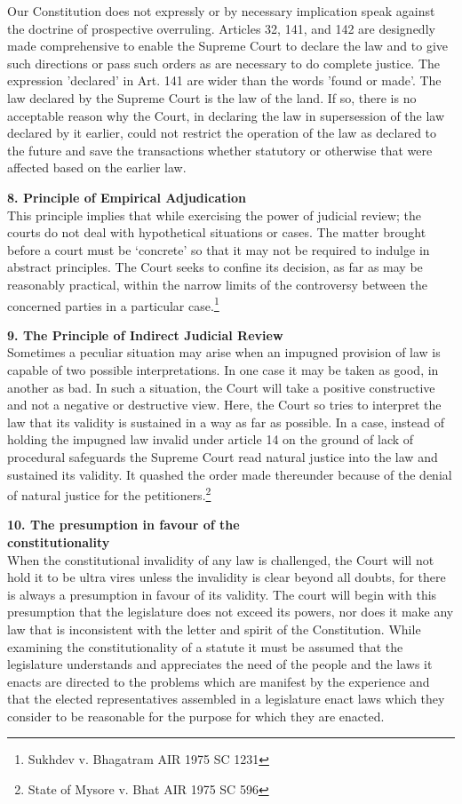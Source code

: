 \begin{multicols}{2}
\noi
Our Constitution does not expressly or by necessary implication speak against the
doctrine of prospective overruling. Articles 32, 141, and 142 are designedly made
comprehensive to enable the Supreme Court to declare the law and to give such
directions or pass such orders as are necessary to do complete justice. The expression
'declared' in Art. 141 are wider than the words 'found or made'. The law declared by the
Supreme Court is the law of the land. If so, there is no acceptable reason why the Court,
in declaring the law in supersession of the law declared by it earlier, could not restrict
the operation of the law as declared to the future and save the transactions whether
statutory or otherwise that were affected based on the earlier law.

\noi
{\bf 8. Principle of Empirical Adjudication}\\[0.2cm]
This principle implies that while exercising the power of judicial review; the courts do
not deal with hypothetical situations or cases. The matter brought before a court must
be ‘concrete’ so that it may not be required to indulge in abstract principles. The Court
seeks to confine its decision, as far as may be reasonably practical, within the narrow
limits of the controversy between the concerned parties in a particular case.\footnote{Sukhdev v. Bhagatram AIR 1975 SC 1231}

\noi
{\bf 9. The Principle of Indirect Judicial Review}\\[0.2cm] Sometimes a peculiar situation may arise when an impugned provision of law is capable
of two possible interpretations. In one case it may be taken as good, in another as bad.
In such a situation, the Court will take a positive constructive and not a negative or
destructive view. Here, the Court so tries to interpret the law that its validity is sustained
in a way as far as possible. In a case, instead of holding the impugned law invalid under
article 14 on the ground of lack of procedural safeguards the Supreme Court read
natural justice into the law and sustained its validity. It quashed the order made
thereunder because of the denial of natural justice for the petitioners.\footnote{ State of Mysore v. Bhat AIR 1975 SC 596}

\noi
{\bf 10. The presumption in favour of the\\ constitutionality}\\[0.2cm] When the constitutional invalidity of any law is challenged, the Court will not hold it
to be ultra vires unless the invalidity is clear beyond all doubts, for there is always a
presumption in favour of its validity. The court will begin with this presumption that
the legislature does not exceed its powers, nor does it make any law that is inconsistent
with the letter and spirit of the Constitution. While examining the constitutionality of
a statute it must be assumed that the legislature understands and appreciates the need
of the people and the laws it enacts are directed to the problems which are manifest by
the experience and that the elected representatives assembled in a legislature enact laws
which they consider to be reasonable for the purpose for which they are enacted.


\end{multicols}
